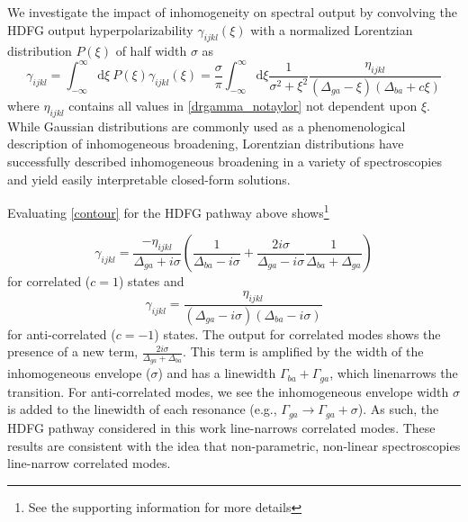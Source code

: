 \documentclass[aip, jcp, reprint, onecolumn, nofootinbib]{revtex4-2}
\begin{document}
We investigate the impact of inhomogeneity on spectral output by convolving the HDFG output hyperpolarizability $\gamma_{ijkl}(\xi)$ with a normalized Lorentzian distribution $P(\xi)$ of half width $\sigma$ as \cite{Desiderio1979, Dick83_1, Carlson1990line} 
\begin{equation}\label{contour}
	\gamma_{ijkl} = \int_{-\infty}^\infty \mathrm{d}\xi \ P(\xi) \gamma_{ijkl}(\xi)
	= \frac{\sigma}{\pi}\int_{-\infty}^\infty \mathrm{d}\xi \frac{1}{\sigma^2 + \xi^2} \frac{\eta_{ijkl}}{\left(\Delta_{ga} - \xi\right)\left(\Delta_{ba}+ c\xi\right)}
\end{equation} 
where $\eta_{ijkl}$ contains all values in \autoref{drgamma_notaylor} not dependent upon $\xi$.
While Gaussian distributions are commonly used as a phenomenological description of inhomogeneous broadening, Lorentzian distributions have successfully described inhomogeneous broadening in a variety of spectroscopies and yield easily interpretable closed-form solutions. \cite{Desiderio1979, Dick83_1, Carlson1990line, RN410}

Evaluating \autoref{contour} for the HDFG pathway above shows\footnote{See the supporting information for more details} 

\begin{equation}\label{linenarrowa}
	\gamma_{ijkl} = \frac{- \eta_{ijkl}}{\Delta_{ga}+ i \sigma} \left( \frac{1}{\Delta_{ba}-i \sigma} + \frac{2 i \sigma}{\Delta_{ga}-i \sigma} \frac{1}{\Delta_{ba} + \Delta_{ga}} \right)
\end{equation}
	for correlated ($c = 1$) states and
\begin{equation}
	\gamma_{ijkl} = \frac{\eta_{ijkl}}{\left(\Delta_{ga}-i\sigma \right) \left(\Delta_{ba}-i \sigma\right)}
\end{equation}
for anti-correlated ($c = -1$) states.
The output for correlated modes shows the presence of a new term, $\frac{2i\sigma}{\Delta_{ga} + \Delta_{ba}}$. 
This term is amplified by the width of the inhomogeneous envelope ($\sigma$) and has a linewidth $\Gamma_{ba} + \Gamma_{ga}$, which linenarrows the transition. 
For anti-correlated modes, we see the inhomogeneous envelope width $\sigma$ is added to the linewidth of each resonance (e.g., $\Gamma_{ga} \rightarrow \Gamma_{ga} + \sigma$).
As such, the HDFG pathway considered in this work line-narrows correlated modes. 
These results are consistent with the idea that non-parametric, non-linear spectroscopies line-narrow correlated modes. \cite{Dick83_1, Carlson1990line}
\end{document}
